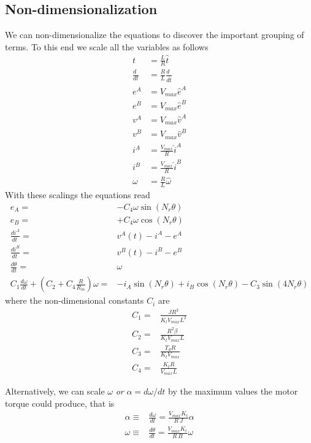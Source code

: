 \documentclass{article}
\begin{document}
\begin{appendix}
\section{Non-dimensionalization}
We can non-dimensionalize the equations to discover the important grouping of terms. To this end we scale all the variables as follows
\begin{subequations}
\begin{align}
t &= \frac{L}{R} \hat{t}\\
\frac{d\phantom{t}}{dt} &= \frac{R}{L} \frac{d\phantom{t}}{d\hat{t}}\\
e^A &= V_{max} \hat{e}^{A}\\
e^B &= V_{max} \hat{e}^{B}\\
v^A &= V_{max} \hat{v}^A\\
v^B &= V_{max} \hat{v}^B\\
i^A&= \frac{V_{max}}{R} \hat{i}^A\\
i^B&= \frac{V_{max}}{R} \hat{i}^B\\
\omega &= \frac{R}{L} \hat{\omega}
\end{align}
\end{subequations}
With these scalings the equations read
\begin{subequations}
\begin{align}
e_A =& - C_4 \omega \sin(N_r\theta)\\
e_B =& + C_4 \omega \cos(N_r\theta) \\
\frac{di^A}{dt^{\ }} =& v^A(t) -  i^A - e^A \\
\frac{di^B}{dt^{\ }} =& v^B(t) -  i^B - e^B \\
\frac{d\theta}{dt} =& \omega\\
C_1 \frac{d \omega}{dt} + (C_2+ C_4 \frac{R}{R_m}) \omega =& 	- i_A \sin(N_r\theta)	+ i_B \cos(N_r\theta)- C_3 \sin(4N_r\theta) 
\end{align}
\end{subequations}
where the non-dimensional constants $C_i$ are 
\begin{subequations}
\begin{align}
C_1 = & \frac{J R^3}{K_t V_{max} L^2}\\
C_2 = & \frac{R^2\beta}{K_t V_{max} L}\\
C_3 = & \frac{T_d R}{K_t V_{max}}\\
C_4 = & \frac{K_t R}{V_{max} L}
\end{align}
\end{subequations}

Alternatively, we can scale $\omega$ {\it or} $\alpha = d\omega/dt$ by the maximum values the motor torque could produce, that is
\begin{align}
\alpha \equiv& \frac{d\omega}{dt} = \frac{V_{max} K_t}{R \, J} \alpha\\
\omega \equiv& \frac{d\theta}{dt} = \frac{V_{max} K_t}{R \, B} \omega
\end{align}



\end{appendix}
\end{document}
